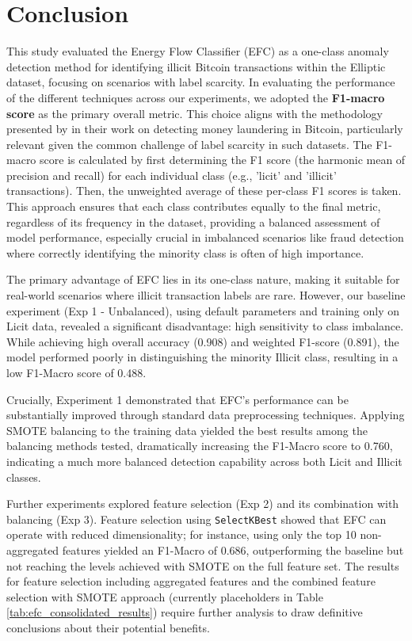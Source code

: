 \documentclass[12pt]{article}
\begin{document}
\section{Conclusion} \label{section:conclusion}

This study evaluated the Energy Flow Classifier (EFC) as a one-class anomaly detection method for identifying illicit Bitcoin
transactions within the Elliptic dataset, focusing on scenarios with label scarcity. In evaluating the performance of the
different techniques across our experiments, we adopted the \textbf{F1-macro score} as the primary overall metric. This
choice aligns with the methodology presented by \cite{lorenz2021machinelearningmethodsdetect} in their work
on detecting money laundering in Bitcoin, particularly relevant given the common challenge of label scarcity in such datasets.
The F1-macro score is calculated by first determining the F1 score (the harmonic mean of precision and recall) for each
individual class (e.g., 'licit' and 'illicit' transactions). Then, the unweighted average of these per-class F1 scores is
taken. This approach ensures that each class contributes equally to the final metric, regardless of its frequency in the
dataset, providing a balanced assessment of model performance, especially crucial in imbalanced scenarios like fraud detection
where correctly identifying the minority class is often of high importance.

The primary advantage of EFC lies in its one-class nature, making it suitable for real-world scenarios where illicit
transaction labels are rare. However, our baseline experiment (Exp 1 - Unbalanced), using default parameters and training
only on Licit data, revealed a significant disadvantage: high sensitivity to class imbalance. While achieving high overall
accuracy (0.908) and weighted F1-score (0.891), the model performed poorly in distinguishing the minority Illicit class,
resulting in a low F1-Macro score of 0.488.

Crucially, Experiment 1 demonstrated that EFC's performance can be substantially improved through standard data preprocessing
techniques. Applying SMOTE balancing to the training data yielded the best results among the balancing methods tested,
dramatically increasing the F1-Macro score to 0.760, indicating a much more balanced detection capability across both
Licit and Illicit classes.

Further experiments explored feature selection (Exp 2) and its combination with balancing (Exp 3). Feature selection using
\texttt{SelectKBest} showed that EFC can operate with reduced dimensionality; for instance, using only the top 10 non-aggregated
features yielded an F1-Macro of 0.686, outperforming the baseline but not reaching the levels achieved with SMOTE on the full
feature set. The results for feature selection including aggregated features and the combined feature selection with SMOTE
approach (currently placeholders in Table \ref{tab:efc_consolidated_results}) require further analysis to draw definitive
conclusions about their potential benefits.
\end{document}
